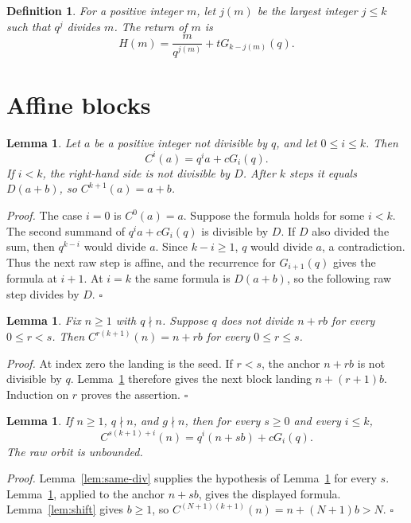 \documentclass[11pt,letterpaper]{article}
\newtheorem{lemma}[theorem]{Lemma}
\newtheorem{definition}[theorem]{Definition}
\newenvironment{proof}{\noindent\textit{Proof.}}{\hfill\(\square\)}
\begin{document}
\begin{definition}
\label{def:clip}
For a positive integer \(m\), let \(j(m)\) be the largest integer \(j\le k\) such that \(q^j\) divides \(m\). The return of \(m\) is
\[
H(m)=\frac{m}{q^{j(m)}}+tG_{k-j(m)}(q).
\]
\end{definition}

\section{Affine blocks}

\begin{lemma}
\label{lem:affine}
Let \(a\) be a positive integer not divisible by \(q\), and let \(0\le i\le k\). Then
\[
C^i(a)=q^ia+cG_i(q).
\]
If \(i<k\), the right-hand side is not divisible by \(D\). After \(k\) steps it equals \(D(a+b)\), so \(C^{k+1}(a)=a+b\).
\end{lemma}

\begin{proof}
The case \(i=0\) is \(C^0(a)=a\). Suppose the formula holds for some \(i<k\). The second summand of \(q^ia+cG_i(q)\) is divisible by \(D\). If \(D\) also divided the sum, then \(q^{k-i}\) would divide \(a\). Since \(k-i\ge 1\), \(q\) would divide \(a\), a contradiction. Thus the next raw step is affine, and the recurrence for \(G_{i+1}(q)\) gives the formula at \(i+1\). At \(i=k\) the same formula is \(D(a+b)\), so the following raw step divides by \(D\).
\end{proof}

\begin{lemma}
\label{lem:prefix}
Fix \(n\ge 1\) with \(q\nmid n\). Suppose \(q\) does not divide \(n+rb\) for every \(0\le r<s\). Then \(C^{r(k+1)}(n)=n+rb\) for every \(0\le r\le s\).
\end{lemma}

\begin{proof}
At index zero the landing is the seed. If \(r<s\), the anchor \(n+rb\)
is not divisible by \(q\). Lemma~\ref{lem:affine} therefore gives the next
block landing \(n+(r+1)b\). Induction on \(r\) proves the assertion.
\end{proof}

\begin{lemma}
\label{lem:escape}
If \(n\ge 1\), \(q\nmid n\), and \(g\nmid n\), then for every \(s\ge 0\) and every \(i\le k\),
\[
C^{s(k+1)+i}(n)=q^i(n+sb)+cG_i(q).
\]
The raw orbit is unbounded.
\end{lemma}

\begin{proof}
Lemma~\ref{lem:same-div} supplies the hypothesis of Lemma~\ref{lem:prefix} for every \(s\). Lemma~\ref{lem:affine}, applied to the anchor \(n+sb\), gives the displayed formula. Lemma~\ref{lem:shift} gives \(b\ge 1\), so \(C^{(N+1)(k+1)}(n)=n+(N+1)b>N\).
\end{proof}
\end{document}

